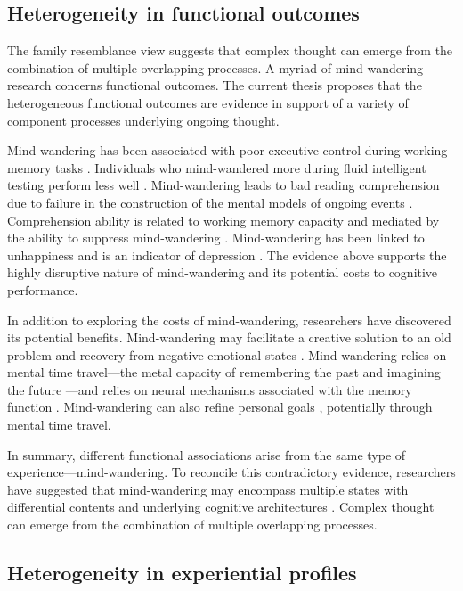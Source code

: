 \subsection{Heterogeneity in functional outcomes}

The family resemblance view suggests that complex thought can emerge from the combination of multiple overlapping processes. A myriad of mind-wandering research concerns functional outcomes. The current thesis proposes that the heterogeneous functional outcomes are evidence in support of a variety of component processes underlying ongoing thought. 

Mind-wandering has been associated with poor executive control during working memory tasks \cite{McVayJOEP2009}. Individuals who mind-wandered more during fluid intelligent testing perform less well \cite{MrazekJoEP2012}. Mind-wandering leads to bad reading comprehension due to failure in the construction of the mental models of ongoing events \cite{Smallwood2008}. Comprehension ability is related to working memory capacity and mediated by the ability to suppress mind-wandering \cite{McVayReading2012, Unsworth2013}. Mind-wandering has been linked to unhappiness \cite{Killingsworth2010} and is an indicator of depression \cite{Smallwood2007}. The evidence above supports the highly disruptive nature of mind-wandering and its potential costs to cognitive performance.

In addition to exploring the costs of mind-wandering, researchers have discovered its potential benefits. Mind-wandering may facilitate a creative solution to an old problem \cite{Baird2012, Smeekens2016} and recovery from negative emotional states \cite{RubyPlos2013, PoerioFrontiers2016}. Mind-wandering relies on mental time travel---the metal capacity of remembering the past and imagining the future \cite{Stawarczyk2015}---and relies on neural mechanisms associated with the memory function \cite{DArgembeau2006,DArgembeau2015}. Mind-wandering can also refine personal goals \cite{Medea2016}, potentially through mental time travel. 

In summary, different functional associations arise from the same type of experience---mind-wandering. To reconcile this contradictory evidence, researchers have suggested that mind-wandering may encompass multiple states with differential contents and underlying cognitive architectures \cite{SmallwoodFrontiers2013}. Complex thought can emerge from the combination of multiple overlapping processes. 

\subsection{Heterogeneity in experiential profiles}

